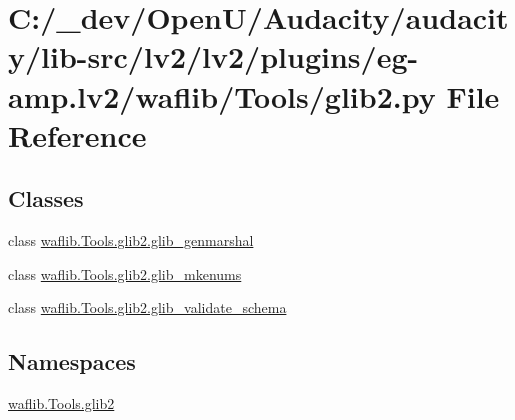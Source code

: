 \hypertarget{lv2_2plugins_2eg-amp_8lv2_2waflib_2_tools_2glib2_8py}{}\section{C\+:/\+\_\+dev/\+Open\+U/\+Audacity/audacity/lib-\/src/lv2/lv2/plugins/eg-\/amp.lv2/waflib/\+Tools/glib2.py File Reference}
\label{lv2_2plugins_2eg-amp_8lv2_2waflib_2_tools_2glib2_8py}
\subsection*{Classes}
\begin{DoxyCompactItemize}
\item 
class \hyperlink{classwaflib_1_1_tools_1_1glib2_1_1glib__genmarshal}{waflib.\+Tools.\+glib2.\+glib\+\_\+genmarshal}
\item 
class \hyperlink{classwaflib_1_1_tools_1_1glib2_1_1glib__mkenums}{waflib.\+Tools.\+glib2.\+glib\+\_\+mkenums}
\item 
class \hyperlink{classwaflib_1_1_tools_1_1glib2_1_1glib__validate__schema}{waflib.\+Tools.\+glib2.\+glib\+\_\+validate\+\_\+schema}
\end{DoxyCompactItemize}
\subsection*{Namespaces}
\begin{DoxyCompactItemize}
\item 
 \hyperlink{namespacewaflib_1_1_tools_1_1glib2}{waflib.\+Tools.\+glib2}
\end{DoxyCompactItemize}
